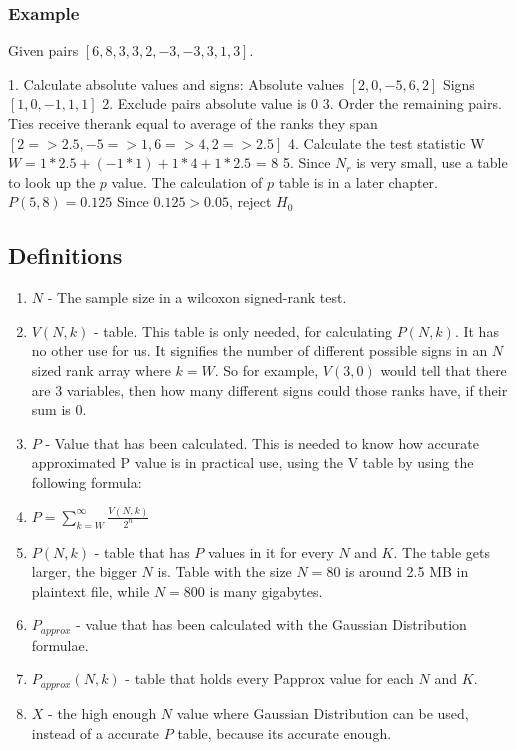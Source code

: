 \documentclass[12pt]{article}
\begin{document}
\subsubsection{Example}
Given pairs $[{6, 8}, {3, 3}, {2, -3}, {-3, 3}, {1, 3}]$.

1. Calculate absolute values and signs:
Absolute values $[2, 0, -5, 6, 2]$
Signs $[1, 0, -1, 1, 1]$
2. Exclude pairs absolute value is $0$
3. Order the remaining pairs. Ties receive therank equal to average of the ranks they span
$[{2 => 2.5}, {-5 => 1}, {6 => 4}, {2 => 2.5}]$
4. Calculate the test statistic W
$W = 1*2.5 + (-1*1) + 1*4 + 1*2.5$ = 8
5. Since $N_r$ is very small, use a table to look up the $p$ value. The calculation of $p$ table is in a later chapter.
$P(5, 8) = 0.125$
Since $0.125 > 0.05$, reject $H_0$

\subsection{Definitions}

\begin{enumerate}
\item
$N$ - The sample size in a wilcoxon signed-rank test.
\item
$V(N, k)$ - table. This table is only needed, for calculating $P(N, k)$. It has no other use for us. It signifies the number of different possible signs in an $N$ sized rank array where $k = W$.  So for example, $V(3, 0)$ would tell that there are 3 variables, then how many different signs could those ranks have, if their sum is 0.
\item
$P$ - Value that has been calculated. This is needed to know how accurate approximated P value is in practical use, using the V table by using the following formula:
\item
$P = \sum\limits_{k=W}^{\infty} \frac{V(N, k)}{2^n}$
\item
$P(N, k)$ - table that has $P$ values in it for every $N$ and $K$. The table gets larger, the bigger $N$ is. Table with the size $N=80$ is around 2.5 MB in plaintext file, while $N=800$ is many gigabytes.
\item
$P_{approx}$ - value that has been calculated with the Gaussian Distribution formulae.
\item
$P_{approx}(N, k)$ - table that holds every Papprox value for each $N$ and $K$.
\item
$X$ - the high enough $N$ value where Gaussian Distribution can be used, instead of a accurate $P$ table, because its accurate enough.
\end{enumerate}
\end{document}
